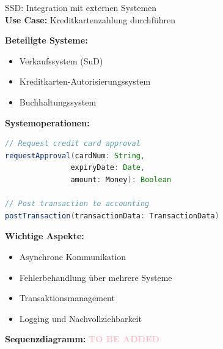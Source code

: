 \begin{example2}{SSD: Integration mit externen Systemen}\\
\textbf{Use Case:} Kreditkartenzahlung durchführen

\textbf{Beteiligte Systeme:}
\begin{itemize}
    \item Verkaufssystem (SuD)
    \item Kreditkarten-Autorisierungssystem
    \item Buchhaltungssystem
\end{itemize}

\textbf{Systemoperationen:}
\begin{lstlisting}[language=Java, style=base]
// Request credit card approval
requestApproval(cardNum: String, 
               expiryDate: Date, 
               amount: Money): Boolean

// Post transaction to accounting
postTransaction(transactionData: TransactionData)
\end{lstlisting}

\textbf{Wichtige Aspekte:}
\begin{itemize}
    \item Asynchrone Kommunikation
    \item Fehlerbehandlung über mehrere Systeme
    \item Transaktionsmanagement
    \item Logging und Nachvollziehbarkeit
\end{itemize}

\textbf{Sequenzdiagramm:} %
\textcolor{pink}{\textbf{TO BE ADDED}}
\end{example2}
















